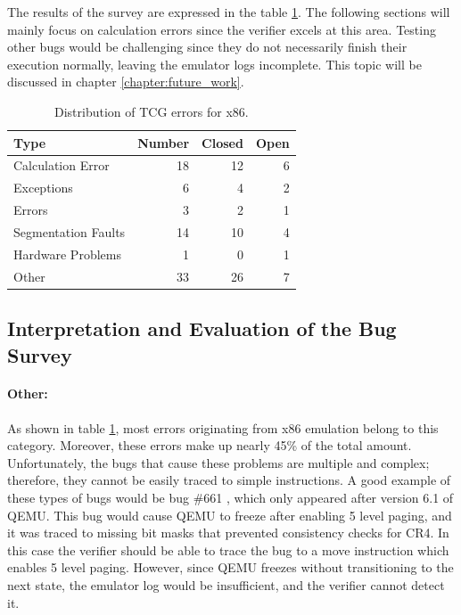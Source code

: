 The results of the survey are expressed in the table \ref{tab:tcg_x86}.
The following sections will mainly focus on calculation errors since the verifier excels at this area.
Testing other bugs would be challenging since they do not necessarily finish their execution normally, leaving the emulator logs incomplete.
This topic will be discussed in chapter \ref{chapter:future_work}.

\begin{table}[htpb]
    \caption[x86 TCG error distribution]{Distribution of TCG errors for x86.}\label{tab:tcg_x86}
    \centering
    \begin{tabular}{l r r r}
      \toprule
        Type & Number & Closed & Open \\
      \midrule
        Calculation Error & 18 & 12 & 6 \\
        Exceptions & 6 & 4 & 2 \\
        Errors & 3 & 2 & 1 \\
        Segmentation Faults & 14 & 10 & 4 \\
        Hardware Problems & 1 & 0 & 1 \\
        Other & 33 & 26 & 7 \\
      \bottomrule
    \end{tabular}
\end{table}

\subsection{Interpretation and Evaluation of the Bug Survey}

\paragraph{Other:}
As shown in table \ref{tab:tcg_x86}, most errors originating from x86 emulation belong to this category.
Moreover, these errors make up nearly 45\% of the total amount.
Unfortunately, the bugs that cause these problems are multiple and complex; therefore, they cannot be easily traced to simple instructions.
A good example of these types of bugs would be bug \#661 \cite{qemu_661}, which only appeared after version 6.1 of \ac{QEMU}.
This bug would cause \ac{QEMU} to freeze after enabling 5 level paging, and it was traced to missing bit masks that prevented consistency checks for CR4.
In this case the verifier should be able to trace the bug to a move instruction which enables 5 level paging.
However, since \ac{QEMU} freezes without transitioning to the next state, the emulator log would be insufficient, and the verifier cannot detect it.

